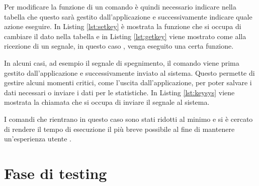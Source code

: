 Per modificare la funzione di un comando è quindi necessario indicare nella tabella che questo sarà gestito dall'applicazione e successivamente indicare quale azione eseguire. In Listing \ref*{lst:setkey} è mostrata la funzione che si occupa di cambiare il dato nella tabella e in Listing \ref*{lst:getkey} viene mostrato come alla ricezione di un segnale, in questo caso , venga eseguito una certa funzione.




In alcuni casi, ad esempio il segnale di spegnimento, il comando viene prima gestito dall'applicazione e successivamente inviato al sistema. Questo permette di gestire alcuni momenti critici, come l'uscita dall'applicazione, per poter salvare i dati necessari o inviare i dati per le statistiche.
In Listing \ref*{lst:keysys} viene mostrata la chiamata che si occupa di inviare il segnale al sistema.



I comandi che rientrano in questo caso sono stati ridotti al minimo e si è cercato di rendere il tempo di esecuzione il più breve possibile al fine di mantenere un'esperienza utente .

\section{Fase di testing}


